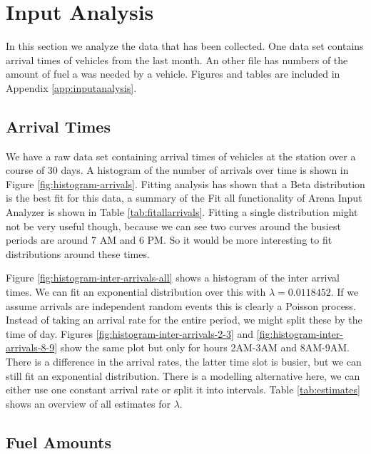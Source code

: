 \section{Input Analysis}

In this section we analyze the data that has been collected. One data set contains arrival times of vehicles from the last month. An other file has numbers of the amount of fuel a was needed by a vehicle.  Figures and tables are included in Appendix \ref{app:inputanalysis}.

\subsection{Arrival Times}

We have a raw data set containing arrival times of vehicles at the station over a course of 30 days. 
A histogram of the number of arrivals over time is shown in Figure \ref{fig:histogram-arrivals}. 
Fitting analysis has shown that a Beta distribution is the best fit for this data, a summary of the Fit all functionality of Arena Input Analyzer is shown in Table \ref{tab:fitallarrivals}. 
Fitting a single distribution might not be very useful though, because we can see two curves around the busiest periods are around 7 AM and 6 PM. 
So it would be more interesting to fit distributions around these times. 

Figure \ref{fig:histogram-inter-arrivals-all} shows a histogram of the inter arrival times. We can fit an exponential distribution over this with $\lambda = 0.0118452$. If we assume arrivals are independent random events this is clearly a Poisson process. Instead of taking an arrival rate for the entire period, we might split these by the time of day. Figures \ref{fig:histogram-inter-arrivals-2-3} and \ref{fig:histogram-inter-arrivals-8-9}  show the same plot but only for hours 2AM-3AM and 8AM-9AM. There is a difference in the arrival rates, the latter time slot is busier, but we can still fit an exponential distribution. There is a modelling alternative here, we can either use one constant arrival rate or split it into intervals. Table \ref{tab:estimates} shows an overview of all estimates for $\lambda$. 


\subsection{Fuel Amounts}

